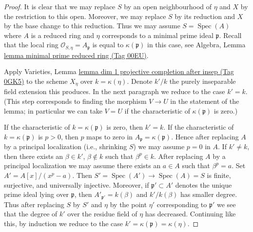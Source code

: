 \documentclass{amsart}
\theoremstyle{plain}
\theoremstyle{definition}
\theoremstyle{remark}
\numberwithin{equation}{subsection}
\def\Spec{\mathop{\mathrm{Spec}}}
\begin{document}
\begin{proof}
It is clear that we may replace $S$ by an open neighbourhood of $\eta$
and $X$ by the restriction to this open.
Moreover, we may replace $S$ by its reduction and $X$ by
the base change to this reduction.
Thus we may assume $S = \Spec(A)$ where $A$ is a reduced ring
and $\eta$ corresponds to a minimal prime ideal $\mathfrak p$.
Recall that the local ring $\mathcal{O}_{S, \eta} = A_\mathfrak p$
is equal to $\kappa(\mathfrak p)$ in this case, see
Algebra, Lemma \href{https://stacks.math.columbia.edu/tag/00EU}{lemma minimal prime reduced ring (Tag 00EU)}.

\medskip\noindent
Apply Varieties, Lemma
\href{https://stacks.math.columbia.edu/tag/0GK5}{lemma dim 1 projective completion after insep (Tag 0GK5)}
to the scheme $X_\eta$ over $k = \kappa(\eta)$.
Denote $k'/k$ the purely inseparable field extension this produces.
In the next paragraph we reduce to the case $k' = k$.
(This step corresponds to finding the morphism $V \to U$ in
the statement of the lemma; in particular we can take $V = U$
if the characteristic of $\kappa(\mathfrak p)$ is zero.)

\medskip\noindent
If the characteristic of $k = \kappa(\mathfrak p)$ is zero, then
$k' = k$. If the characteristic of $k = \kappa(\mathfrak p)$
is $p > 0$, then $p$ maps to zero in $A_\mathfrak p = \kappa(\mathfrak p)$.
Hence after replacing $A$ by a principal localization (i.e.,
shrinking $S$) we may assume $p = 0$ in $A$. If $k' \not = k$, then
there exists an $\beta \in k'$, $\beta \not \in k$
such that $\beta^p \in k$. After replacing $A$ by a principal
localization we may assume there exists an $a \in A$ such
that $\beta^p = a$. Set $A' = A[x]/(x^p - a)$.
Then $S' = \Spec(A') \to \Spec(A) = S$ is finite, surjective, and
universally injective. Moreover, if $\mathfrak p' \subset A'$
denotes the unique prime ideal lying over $\mathfrak p$,
then $A'_{\mathfrak p'} = k(\beta)$ and $k'/k(\beta)$
has smaller degree. Thus after replacing $S$ by $S'$
and $\eta$ by the point $\eta'$ corresponding to $\mathfrak p'$
we see that the degree of $k'$ over the residue field of $\eta$
has decreased. Continuing like this, by induction we reduce
to the case $k' = \kappa(\mathfrak p) = \kappa(\eta)$.


\end{proof}
\end{document}
